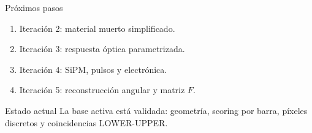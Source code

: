 \documentclass[aspectratio=169]{beamer}
\begin{document}
\begin{frame}{Próximos pasos}
  \begin{enumerate}
    \item Iteración 2: material muerto simplificado.
    \item Iteración 3: respuesta óptica parametrizada.
    \item Iteración 4: SiPM, pulsos y electrónica.
    \item Iteración 5: reconstrucción angular y matriz \(F\).
  \end{enumerate}

  \vspace{1em}
  \begin{block}{Estado actual}
    La base activa está validada: geometría, scoring por barra, píxeles discretos
    y coincidencias LOWER-UPPER.
  \end{block}
\end{frame}
\end{document}
